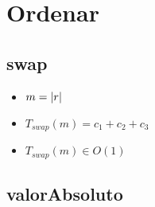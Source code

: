 \documentclass{article}
\begin{document}
    \section*{Ordenar}

    \subsection*{swap}

    \begin{minipage}{0.70\textwidth}
        
    \end{minipage}
    \hfill
    \begin{minipage}{0.25\textwidth}
    \end{minipage}

    \begin{itemize}
        \item $m = |r|$
        \item $T_{swap}(m) = c_1 +
                             c_2 +
                             c_3 $
        \item $T_{swap}(m) \in O(1)$
    \end{itemize}

    \subsection*{valorAbsoluto}

    \begin{minipage}{0.70\textwidth}
        
    \end{minipage}
    \hfill
    \begin{minipage}{0.25\textwidth}
    \end{minipage}
\end{document}
